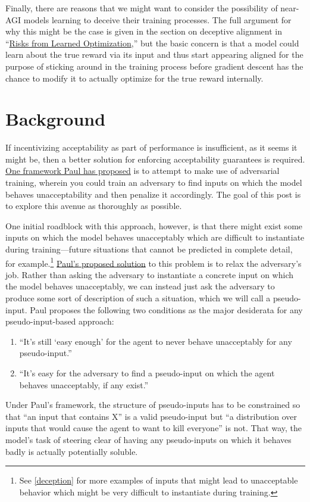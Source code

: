\documentclass{amsart}
\begin{document}
Finally, there are reasons that we might want to consider the possibility of near-AGI models learning to deceive their training processes. The full argument for why this might be the case is given in the section on deceptive alignment in ``\href{https://arxiv.org/abs/1906.01820}{Risks from Learned Optimization},'' but the basic concern is that a model could learn about the true reward via its input and thus start appearing aligned for the purpose of sticking around in the training process before gradient descent has the chance to modify it to actually optimize for the true reward internally.

\section{Background}

If incentivizing acceptability as part of performance is insufficient, as it seems it might be, then a better solution for enforcing acceptability guarantees is required. \href{https://ai-alignment.com/training-robust-corrigibility-ce0e0a3b9b4d}{One framework Paul has proposed} is to attempt to make use of adversarial training, wherein you could train an adversary to find inputs on which the model behaves unacceptability and then penalize it accordingly. The goal of this post is to explore this avenue as thoroughly as possible.

One initial roadblock with this approach, however, is that there might exist some inputs on which the model behaves unacceptably which are difficult to instantiate during training---future situations that cannot be predicted in complete detail, for example.\footnote{See \autoref{deception} for more examples of inputs that might lead to unacceptable behavior which might be very difficult to instantiate during training.} \href{https://ai-alignment.com/training-robust-corrigibility-ce0e0a3b9b4d}{Paul's proposed solution} to this problem is to relax the adversary's job. Rather than asking the adversary to instantiate a concrete input on which the model behaves unacceptably, we can instead just ask the adversary to produce some sort of description of such a situation, which we will call a pseudo-input. Paul proposes the following two conditions as the major desiderata for any pseudo-input-based approach:
\begin{enumerate}
    \item ``It's still ‘easy enough' for the agent to never behave unacceptably for any pseudo-input.''
    \item ``It's easy for the adversary to find a pseudo-input on which the agent behaves unacceptably, if any exist.''
\end{enumerate}
Under Paul's framework, the structure of pseudo-inputs has to be constrained so that ``an input that contains X'' is a valid pseudo-input but ``a distribution over inputs that would cause the agent to want to kill everyone'' is not. That way, the model's task of steering clear of having any pseudo-inputs on which it behaves badly is actually potentially soluble.
\end{document}
